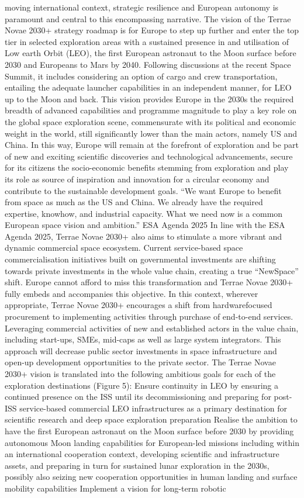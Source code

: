 \documentclass[12pt]{article}
\begin{document}
moving international context, strategic resilience and European autonomy is paramount and central to this encompassing narrative. The vision of the Terrae Novae 2030+ strategy roadmap is for Europe to step up further and enter the top tier in selected exploration areas with a sustained presence in and utilisation of Low earth Orbit (LEO), the first European astronaut to the Moon surface before 2030 and Europeans to Mars by 2040. Following discussions at the recent Space Summit, it includes considering an option of cargo and crew transportation, entailing the adequate launcher capabilities in an independent manner, for LEO up to the Moon and back. This vision provides Europe in the 2030s the required breadth of advanced capabilities and programme magnitude to play a key role on the global space exploration scene, commensurate with its political and economic weight in the world, still significantly lower than the main actors, namely US and China. In this way, Europe will remain at the forefront of exploration and be part of new and exciting scientific discoveries and technological advancements, secure for its citizens the socio-economic benefits stemming from exploration and play its role as source of inspiration and innovation for a circular economy and contribute to the sustainable development goals. “We want Europe to benefit from space as much as the US and China. We already have the required expertise, knowhow, and industrial capacity. What we need now is a common European space vision and ambition.” ESA Agenda 2025 In line with the ESA Agenda 2025, Terrae Novae 2030+ also aims to stimulate a more vibrant and dynamic commercial space ecosystem. Current service-based space commercialisation initiatives built on governmental investments are shifting towards private investments in the whole value chain, creating a true “NewSpace” shift. Europe cannot afford to miss this transformation and Terrae Novae 2030+ fully embeds and accompanies this objective. In this context, wherever appropriate, Terrae Novae 2030+ encourages a shift from hardwarefocused procurement to implementing activities through purchase of end-to-end services. Leveraging commercial activities of new and established actors in the value chain, including start-ups, SMEs, mid-caps as well as large system integrators. This approach will decrease public sector investments in space infrastructure and open-up development opportunities to the private sector. The Terrae Novae 2030+ vision is translated into the following ambitious goals for each of the exploration destinations (Figure 5): Ensure continuity in LEO by ensuring a continued presence on the ISS until its decommissioning and preparing for post-ISS service-based commercial LEO infrastructures as a primary destination for scientific research and deep space exploration preparation Realise the ambition to have the first European astronaut on the Moon surface before 2030 by providing autonomous Moon landing capabilities for European-led missions including within an international cooperation context, developing scientific and infrastructure assets, and preparing in turn for sustained lunar exploration in the 2030s, possibly also seizing new cooperation opportunities in human landing and surface mobility capabilities Implement a vision for long-term robotic 
\end{document}
